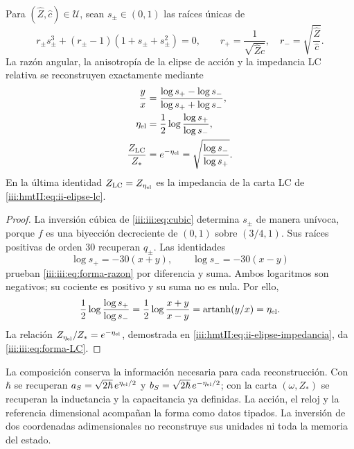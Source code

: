 \begin{proposition}
\label{iii:iii:prop:forma-LC}
Para $(\widehat Z,\widehat c)\in\mathcal U$, sean $s_\pm\in(0,1)$ las
raíces únicas de
\begin{equation}
 r_\pm s_\pm^3+(r_\pm-1)(1+s_\pm+s_\pm^2)=0,
 \qquad
 r_+=\frac1{\sqrt{\widehat Z\widehat c}},\quad
 r_-=\sqrt{\frac{\widehat Z}{\widehat c}}.
 \label{iii:iii:eq:forma-inversion}
\end{equation}
La razón angular, la anisotropía de la elipse de acción y la impedancia
LC relativa se reconstruyen exactamente mediante
\begin{align}
 \frac{y}{x}
 &=\frac{\log s_+-\log s_-}{\log s_++\log s_-},
 \label{iii:iii:eq:forma-razon}\\
 \eta_{\rm el}
 &=\frac12\log\frac{\log s_+}{\log s_-},
 \label{iii:iii:eq:forma-eta}\\
 \frac{Z_{\rm LC}}{Z_*}
 &=e^{-\eta_{\rm el}}
  =\sqrt{\frac{\log s_-}{\log s_+}}.
 \label{iii:iii:eq:forma-LC}
\end{align}
En la última identidad $Z_{\rm LC}=Z_{\eta_{\rm el}}$ es la impedancia
de la carta LC de \eqref{iii:hmtII:eq:ii-elipse-lc}.
\end{proposition}
\begin{proof}
La inversión cúbica de \eqref{iii:iii:eq:cubic} determina $s_\pm$ de manera
unívoca, porque $f$ es una biyección decreciente de $(0,1)$ sobre
$(3/4,1)$. Sus raíces positivas de orden $30$ recuperan $q_\pm$.
Las identidades
\[
 \log s_+=-30(x+y),\qquad \log s_-=-30(x-y)
\]
prueban \eqref{iii:iii:eq:forma-razon} por diferencia y suma. Ambos logaritmos
son negativos; su cociente es positivo y su suma no es nula. Por ello,
\[
 \frac12\log\frac{\log s_+}{\log s_-}
   =\frac12\log\frac{x+y}{x-y}
   =\operatorname{artanh}(y/x)=\eta_{\rm el}.
\]
La relación $Z_{\eta_{\rm el}}/Z_*=e^{-\eta_{\rm el}}$, demostrada en
\eqref{iii:hmtII:eq:ii-elipse-impedancia}, da \eqref{iii:iii:eq:forma-LC}.
\end{proof}

La composición conserva la información necesaria para cada reconstrucción.
Con $\hbar$ se recuperan
$a_S=\sqrt{2\hbar}\,e^{\eta_{\rm el}/2}$ y
$b_S=\sqrt{2\hbar}\,e^{-\eta_{\rm el}/2}$; con la carta
$(\omega,Z_*)$ se recuperan la inductancia y la capacitancia ya definidas.
La acción, el reloj y la referencia dimensional acompañan la forma como
datos tipados. La inversión de dos coordenadas adimensionales no
reconstruye sus unidades ni toda la memoria del estado.

